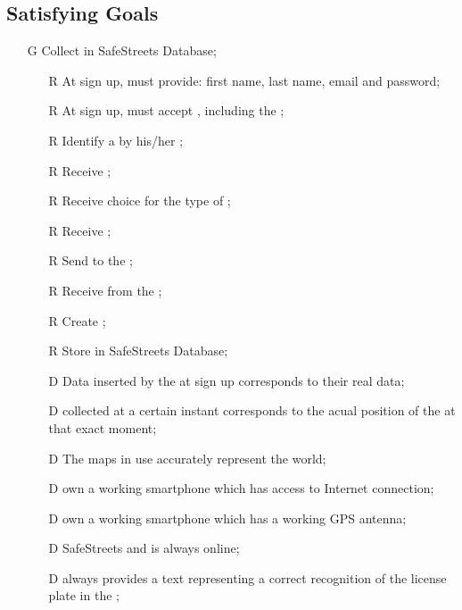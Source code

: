 \documentclass[../../../rasd.tex]{subfiles}
\begin{document}
\subsection{Satisfying Goals\label{sect:3.2.6}}
\begin{itemize}
	\item[G\subs{1}]Collect  in SafeStreets Database;
	\begin{itemize}
		\item[R\subs{1}]At sign up,  must provide: first name, last name, email and password;
		\item[R\subs{2}]At sign up,  must accept , including the ;
		\item[R\subs{3}]Identify a  by his/her ;
		\item[R\subs{4}]Receive ;
		\item[R\subs{5}]Receive  choice for the type of ;
		\item[R\subs{6}]Receive ;
		\item[R\subs{7}]Send  to the ;
		\item[R\subs{8}]Receive  from the ;
		\item[R\subs{9}]Create ;
		\item[R\subs{10}]Store  in SafeStreets Database;
		\\
		\item[D\subs{1}]Data inserted by the  at sign up corresponds to their real data;
		\item[D\subs{2}] collected at a certain instant corresponds to the acual position of the  at that exact moment;
		\item[D\subs{3}]The maps in use accurately represent the world;
		\item[D\subs{4}] own a working smartphone which has access to Internet connection;
		\item[D\subs{5}] own a working smartphone which has a working GPS antenna;
		\item[D\subs{6}]SafeStreets and  is always online;
		\item[D\subs{7}] always provides a text representing a correct recognition of the license plate in the ;
	\end{itemize}


\end{itemize}
\end{document}
